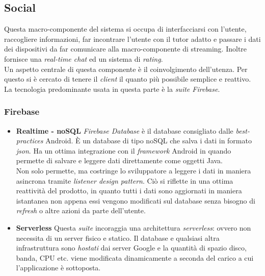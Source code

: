 \documentclass[conference]{IEEEtran}
\begin{document}
	\subsection{Social}
		Questa macro-componente del sistema si occupa di interfacciarsi con l'utente, raccogliere informazioni, far incontrare l'utente con
		il tutor adatto e passare i dati dei dispositivi da far comunicare alla macro-componente di streaming.
		Inoltre fornisce una \textit{real-time chat} ed un sistema di \textit{rating}.\\
		Un aspetto centrale di questa componente è il coinvolgimento dell'utenza. Per questo si è cercato di tenere il \textit{client} il quanto
		più possibile semplice e reattivo.\\
		La tecnologia predominante usata in questa parte è la \textit{suite Firebase}.
		
		\subsubsection{Firebase}
		\begin{itemize}
			\item \textbf{Realtime - noSQL}
				\textit{Firebase Database} è il database consigliato dalle \textit{best-practices} Android. È un database di tipo noSQL
				che salva i dati in formato \textit{json}. Ha un ottima integrazione con il \textit{framework} Android in quando permette
				di salvare e leggere dati direttamente come oggetti Java.\\
				Non solo permette, ma costringe	lo sviluppatore a leggere i dati in maniera asincrona tramite \textit{listener design pattern}. Ciò si riflette
				in una ottima reattività del prodotto, in quanto tutti i dati sono aggiornati in maniera istantanea non appena essi
				vengono modificati sul database senza bisogno di \textit{refresh} o altre azioni da parte dell'utente.\\
			
			\item \textbf{Serverless}
				Questa \textit{suite} incoraggia una architettura \textit{serverless}: ovvero non necessita di un server fisico e statico.
				Il database e qualsiasi altra infrastruttura sono \textit{hostati} dai server Google e la quantità di spazio disco, 
				banda, CPU etc. viene modificata dinamicamente a seconda del carico a cui l'applicazione è sottoposta.
		\end{itemize}
\end{document}
